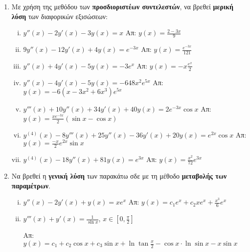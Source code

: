 \begin{enumerate}
  \item Με χρήση της μεθόδου των \textbf{προσδιοριστέων συντελεστών}, να βρεθεί 
    \textbf{μερική λύση} των διαφορικών εξισώσεων:
    \begin{enumerate}[i)]
      \item $y''(x)-2y'(x)-3y(x)=x$ \hfill Απ: $y(x)=\frac{2-3x}{9}$
      \item $9y''(x)-12y'(x)+4y(x)=e^{-3x}$ \hfill Απ: $y(x)=\frac{e^{-3x}}{121}$
      \item $y''(x)+4y'(x)-5y(x)=-3e^{x}$ \hfill Απ: $y(x)=-x\frac{e^{x}}{2}$
      \item $y''(x)-4y'(x)-5y(x)=-648x^{2}e^{5x}$ 
        \hfill Απ: $ y(x)=-6(x-3x^{2}+6x^{3})e^{5x}$
      \item $y'''(x)+10y''(x)+34y'(x)+40y(x)=2e^{-3x}\cos x$ 
        \hfill Απ: $y(x)= \frac{xe^{-3x}}{2}(\sin x - \cos x)$
      \item $y^{(4)}(x)-8y'''(x)+25y''(x)-36y'(x)+20y(x)=e^{2x}\cos x$ 
        \hfill Απ: $y(x) =\frac{-x}{2}e^{2x}\sin x$
      \item $y^{(4)}(x)-18y''(x)+81y(x)=e^{3x}$ \hfill Απ: $y(x)=\frac{x^{2}}{72}e^{3x}$
    \end{enumerate}

  \item Να βρεθεί η \textbf{γενική λύση} των παρακάτω σδε με τη μέθοδο 
    \textbf{μεταβολής των παραμέτρων}.
    \begin{enumerate}[i)]
      \item $y''(x)-2y'(x)+y(x)=xe^{x}$ 
        \hfill Απ: $y(x)=c_{1}e^{x}+c_{2}xe^{x}+\frac{x^{3}}{6}e^{x}$
      \item $y'''(x)+y'(x)=\frac{1}{\sin x}$, $x\in [0,\frac{\pi}{2}]$

        \hfill Απ: $y(x)=c_{1}+c_2\cos x+c_3 \sin x+\ln \tan \frac{x}{2}-
        \cos x\cdot\ln\sin x-x\sin x$
    \end{enumerate}


\end{enumerate}
